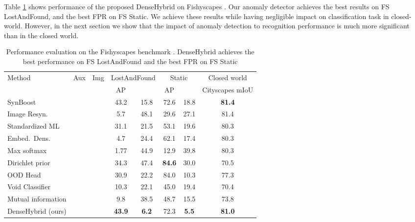 \documentclass[runningheads]{llncs}
\newcommand{\cmark}{\ding{51}}
\newcommand{\xmark}{\ding{55}}
\begin{document}
Table \ref{table:fishy} shows performance of the proposed DenseHybrid on Fishyscapes \cite{blum21ijcv}.
Our anomaly detector achieves the best results on FS LostAndFound, and the best FPR on FS Static.
We achieve these results while having negligible impact on classification task in closed-world.
However, in the next section we show that the impact of anomaly detection to recognition performance is much more significant than in the closed world.
\begin{table}[h]
\begin{center}
\caption{
Performance evaluation on the Fishyscapes benchmark \cite{blum21ijcv}.
DenseHybrid achieves the best performance on FS LostAndFound and the best FPR on FS Static}
\label{table:fishy}
\begin{tabular}{lccccccc}
\hline\hline
\multicolumn{1}{l}{\multirow{2}{*}{Method}} & \multicolumn{1}{c}{\multirow{2}{*}{Aux}} & \multicolumn{1}{c|}{\multirow{2}{*}{Img}} & \multicolumn{2}{c|}{LostAndFound} & \multicolumn{2}{c|}{Static} & Closed world\\
\multicolumn{1}{l}{} & \multicolumn{1}{c}{data} & \multicolumn{1}{c|}{rsyn.} & AP & \multicolumn{1}{c|}{} & AP & \multicolumn{1}{c|}{} & Cityscapes mIoU \\\hline \hline
SynBoost \cite{biase21cvpr} & \cmark& \cmark & 43.2 & 15.8 &  72.6 & 18.8 & \textbf{81.4}\\
Image Resyn. \cite{lis19iccv} & \xmark& \cmark& 5.7 & 48.1 & 29.6 & 27.1 & 81.4\\
Standardized ML \cite{jung21iccv} & \xmark&  \xmark & 31.1 & 21.5 & 53.1 & 19.6 & 80.3\\
Embed.\ Dens.\ \cite{blum21ijcv} & \xmark&  \xmark & 4.7 & 24.4  & 62.1 & 17.4  & 80.3\\
Max softmax \cite{hendrycks17iclr} & \xmark&  \xmark & 1.77 & 44.9 & 12.9 & 39.8  & 80.3\\
Dirichlet prior \cite{malinin18nips} & \cmark& \xmark & 34.3 & 47.4 & \textbf{84.6} & 30.0 & 70.5\\ 
OOD Head \cite{bevandic19gcpr} & \cmark& \xmark & 30.9 & 22.2 & 84.0 & 10.3 & 77.3\\ 
Void Classifier \cite{blum21ijcv} & \cmark& \xmark & 10.3 & 22.1 & 45.0 & 19.4 & 70.4\\
Mutual information \cite{mukhoti18arxiv} & \cmark& \xmark & 9.8 & 38.5 & 48.7 & 15.5 & 73.8\\\hline
DenseHybrid (ours) & \cmark&  \xmark & \textbf{43.9} & \textbf{6.2} & 72.3 & \textbf{5.5} & \textbf{81.0} \\  \hline
\end{tabular}
\end{center}
\end{table}
\end{document}
